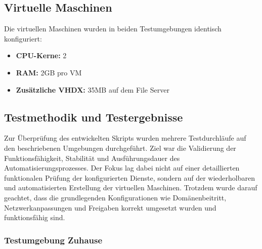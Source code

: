 \documentclass[a4paper,12pt]{article}
\begin{document}
\subsection*{Virtuelle Maschinen}

Die virtuellen Maschinen wurden in beiden Testumgebungen identisch konfiguriert:

\begin{itemize}
\item \textbf{CPU-Kerne:} 2
\item \textbf{RAM:} 2GB pro VM
\item \textbf{Zusätzliche VHDX:} 35MB auf dem File Server
\end{itemize}



\subsection*{Testmethodik und Testergebnisse}

Zur Überprüfung des entwickelten Skripts wurden mehrere Testdurchläufe auf den beschriebenen Umgebungen durchgeführt.
Ziel war die Validierung der Funktionsfähigkeit, Stabilität und Ausführungsdauer des Automatisierungsprozesses.
Der Fokus lag dabei nicht auf einer detaillierten funktionalen Prüfung der konfigurierten Dienste, sondern auf der wiederholbaren und automatisierten Erstellung der virtuellen Maschinen.
Trotzdem wurde darauf geachtet, dass die grundlegenden Konfigurationen wie Domänenbeitritt, Netzwerkanpassungen und Freigaben korrekt umgesetzt wurden und funktionsfähig sind.\\


\subsubsection{Testumgebung Zuhause}
\end{document}
